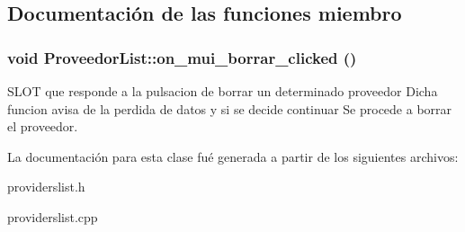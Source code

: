 \subsection{Documentaci\'{o}n de las funciones miembro}
\subsubsection{\setlength{\rightskip}{0pt plus 5cm}void Proveedor\-List::on\_\-mui\_\-borrar\_\-clicked ()\hspace{0.3cm}{\tt  [virtual, slot]}}\label{classProveedorList_i2}


SLOT que responde a la pulsacion de borrar un determinado proveedor Dicha funcion avisa de la perdida de datos y si se decide continuar Se procede a borrar el proveedor. 

La documentaci\'{o}n para esta clase fu\'{e} generada a partir de los siguientes archivos:\begin{CompactItemize}
\item 
providerslist.h\item 
providerslist.cpp\end{CompactItemize}
